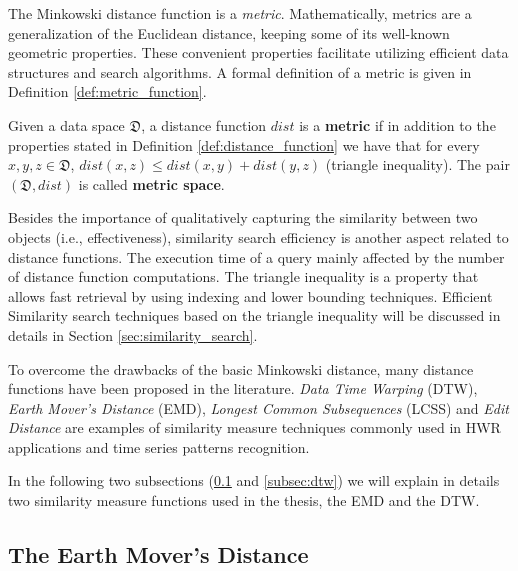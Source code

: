 \iftoggle{edit-mode}{\hspace{0pt}\marginpar{Metric Definition}}{}
The Minkowski distance function is a \emph{metric}. Mathematically, metrics are a generalization of the Euclidean distance, keeping some of its well-known geometric properties. 
These convenient properties facilitate utilizing efficient data structures and search algorithms. A formal definition of a metric is given in Definition \ref{def:metric_function}.

\begin{definition}
Given a data space $\mathfrak{D}$, a distance function $dist$ is a \textbf{metric} if in addition to the properties stated in Definition \ref{def:distance_function} we have that for every $x,y,z \in \mathfrak{D}$, $dist(x,z) \leq dist(x,y) + dist(y,z)$ (triangle inequality). The pair $(\mathfrak{D},dist)$ is called \textbf{metric space}.
\label{def:metric_function}
\end{definition}

\iftoggle{edit-mode}{\hspace{0pt}\marginpar{Efficiency and Triangularity}}{}
Besides the importance of qualitatively capturing the similarity between two objects (i.e., effectiveness), similarity search efficiency is another aspect related to distance functions. 
The execution time of a query mainly affected by the number of distance function computations. 
The triangle inequality is a property that allows fast retrieval by using indexing and lower bounding techniques. 
Efficient Similarity search techniques based on the triangle inequality will be discussed in details in Section \ref{sec:similarity_search}.

\iftoggle{edit-mode}{\hspace{0pt}\marginpar{Advanced distance measure techniques}}{}
To overcome the drawbacks of the basic Minkowski distance, many distance functions have been proposed in the literature. 
\emph{Data Time Warping} (DTW), \emph{Earth Mover's Distance} (EMD), \emph{Longest Common Subsequences} (LCSS) and \emph{Edit Distance} are examples of similarity measure techniques commonly used in HWR applications and time series patterns recognition. 

\iftoggle{edit-mode}{\hspace{0pt}\marginpar{Next Subsections}}{}
In the following two subsections (\ref{subsec:emd} and \ref{subsec:dtw}) we will explain in details two similarity measure functions used in the thesis, the EMD and the DTW. 

\subsection{The Earth Mover's Distance}
\label{subsec:emd}

